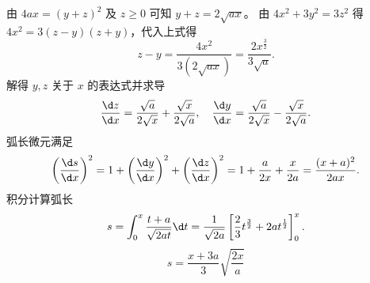 \begin{solution}
    由 $4ax = (y+z)^2$ 及 $z \ge 0$ 可知 $y+z = 2\sqrt{ax}$。
    由 $4x^2 + 3y^2 = 3z^2$ 得 $4x^2 = 3(z-y)(z+y)$，代入上式得
    \begin{equation}
        z-y = \frac{4x^2}{3(2\sqrt{ax})} = \frac{2x^{\frac{3}{2}}}{3\sqrt{a}}.
    \end{equation}
    解得 $y, z$ 关于 $x$ 的表达式并求导
    \begin{equation}
        \frac{\d z}{\d x} = \frac{\sqrt{a}}{2\sqrt{x}} + \frac{\sqrt{x}}{2\sqrt{a}}, \quad \frac{\d y}{\d x} = \frac{\sqrt{a}}{2\sqrt{x}} - \frac{\sqrt{x}}{2\sqrt{a}}.
    \end{equation}
    弧长微元满足
    \begin{equation}
        \left( \frac{\d s}{\d x} \right)^2 = 1 + \left( \frac{\d y}{\d x} \right)^2 + \left( \frac{\d z}{\d x} \right)^2 = 1 + \frac{a}{2x} + \frac{x}{2a} = \frac{(x+a)^2}{2ax}.
    \end{equation}
    积分计算弧长
    \begin{equation}
        s = \int_{0}^{x} \frac{t+a}{\sqrt{2at}} \d t = \frac{1}{\sqrt{2a}} \left[ \frac{2}{3}t^{\frac{3}{2}} + 2at^{\frac{1}{2}} \right]_0^x.
    \end{equation}
    \begin{equation}
        \boxed{s = \frac{x+3a}{3}\sqrt{\frac{2x}{a}}}
    \end{equation}
\end{solution}

